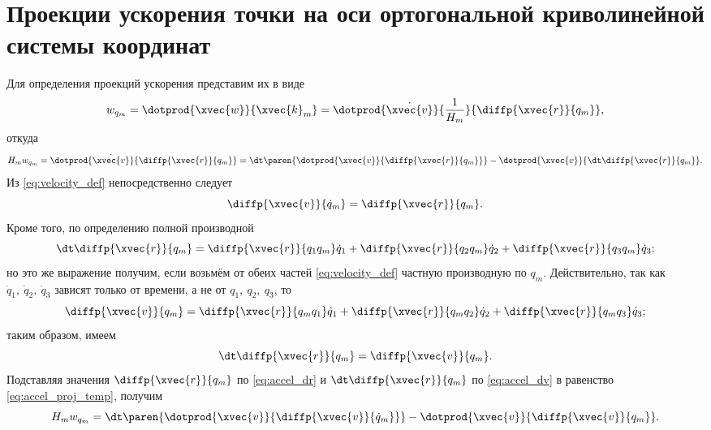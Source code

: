 \section{Проекции ускорения точки на оси ортогональной криволинейной системы
координат}

Для определения проекций ускорения представим их в виде
\begin{equation*}
  w_{q_m} = \dotprod{\xvec{w}}{\xvec{k}_m} =
    \dotprod{\dot{\xvec{v}}}{\frac{1}{H_m}}{\diffp{\xvec{r}}{{q_m}}},
\end{equation*}
откуда
\begin{equation}
  \label{eq:accel_proj_temp}
  H_m w_{q_m} = \dotprod{\dot{\xvec{v}}}{\diffp{\xvec{r}}{{q_m}}} =
    \dt \paren{\dotprod{\xvec{v}}{\diffp{\xvec{r}}{{q_m}}}}
    - \dotprod{\xvec{v}}{\dt \diffp{\xvec{r}}{{q_m}}}.
\end{equation}
Из \autoref{eq:velocity_def} непосредственно следует
\begin{equation}
  \label{eq:accel_dr}
  \diffp{\xvec{v}}{{\dot{q}_m}} = \diffp{\xvec{r}}{{q_m}}.
\end{equation}
Кроме того, по определению полной производной
\begin{equation*}
  \dt \diffp{\xvec{r}}{{q_m}} = \diffp{\xvec{r}}{{q_1}{q_m}} \dot{q}_1 +
    \diffp{\xvec{r}}{{q_2}{q_m}} \dot{q}_2 +
    \diffp{\xvec{r}}{{q_3}{q_m}} \dot{q}_3;
\end{equation*}
но это же выражение получим, если возьмём от обеих частей
\autoref{eq:velocity_def} частную производную по $q_m$. Действительно, так как
$\dot{q}_1,~\dot{q}_2,~\dot{q}_3$ зависят только от времени, а не от
$q_1,~q_2,~q_3$, то
\begin{equation*}
  \diffp{\xvec{v}}{{q_m}} = \diffp{\xvec{r}}{{q_m}{q_1}} \dot{q}_1 +
    \diffp{\xvec{r}}{{q_m}{q_2}} \dot{q}_2 + \diffp{\xvec{r}}{{q_m}{q_3}}
    \dot{q}_3;
\end{equation*}
таким образом, имеем
\begin{equation}
  \label{eq:accel_dv}
  \dt \diffp{\xvec{r}}{{q_m}} = \diffp{\xvec{v}}{{q_m}}.
\end{equation}
Подставляя значения ${\displaystyle \diffp{\xvec{r}}{{q_m}}}$ по
\autoref{eq:accel_dr} и ${\displaystyle \dt \diffp{\xvec{r}}{{q_m}}}$ по
\autoref{eq:accel_dv} в равенство \ref{eq:accel_proj_temp}, получим
\begin{equation}
  \label{eq:accel_proj_temp2}
  H_m w_{q_m} = \dt \paren{\dotprod{\xvec{v}}{\diffp{\xvec{v}}{{\dot{q}_m}}}} -
    \dotprod{\xvec{v}}{\diffp{\xvec{v}}{{q_m}}}.
\end{equation}
